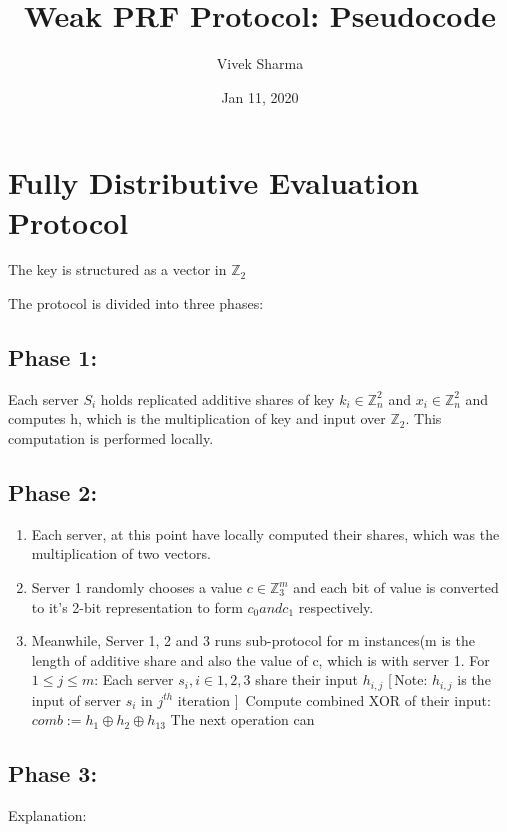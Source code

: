 \documentclass[11pt]{article}
\title{Weak PRF Protocol: Pseudocode}
\author{Vivek Sharma}
\date{Jan 11, 2020}
\begin{document}
\maketitle


\section{Fully Distributive Evaluation Protocol}
The key is structured as a vector in $\mathbb{Z}_2$


The protocol is divided into three phases:

\subsection{Phase 1:} 
Each server $S_{i}$ holds replicated additive shares of key $k_{i} \in \mathbb{Z}_{n}^{2}$ and $x_{i} \in \mathbb{Z}_{n}^{2}$ and computes h, which is the multiplication of key and input over $\mathbb{Z}_2$. This computation is performed locally. 
\subsection{Phase 2:}

\begin{enumerate}
	\item Each server, at this point have locally computed their shares, which was the multiplication of two vectors.
	\item Server 1 randomly chooses a value $c \in \mathbb{Z}_{3}^{m}$ and each bit of value is converted to it's 2-bit representation to form $c_{0} and c_{1}$ respectively. 
	\item Meanwhile, Server 1, 2 and 3 runs sub-protocol for m instances(m is the length of additive share and also the value of c, which is with server 1.
	\subitem For $1 \leq j \leq m$:
	\subitem Each server $s_{i} , i \in {1,2,3}$ share their input $h_{i,j}$ [\,Note: $h_{i,j}$ is the input of server $s_{i}$ in $j^{th}$ iteration ]\,
	\subitem Compute combined XOR of their input: $comb := h_{1} \oplus h_{2} \oplus h_{13}$
	\subitem The next operation can 
\end{enumerate}

\subsection{Phase 3:}


 
Explanation:
\end{document}
